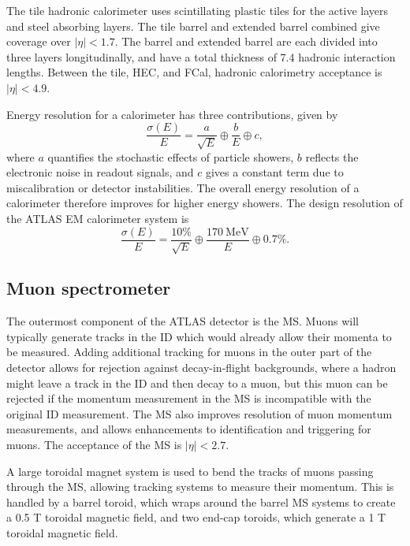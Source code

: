 The tile hadronic calorimeter uses scintillating plastic tiles for the active
layers and steel absorbing layers. The tile barrel and extended barrel combined
give coverage over $|\eta| < 1.7$. The barrel and extended barrel are each divided
into three layers longitudinally, and have a total thickness of 7.4 hadronic
interaction lengths. 
Between the tile, \ac{HEC}, and \ac{FCal}, hadronic calorimetry acceptance is
$|\eta| < 4.9$.

Energy resolution for a calorimeter has three contributions, given by
\begin{equation*}
  \frac{\sigma(E)}{E} = \frac{a}{\sqrt{E}} \oplus \frac{b}{E} \oplus c,
\end{equation*}
where $a$ quantifies the stochastic effects of particle
showers, $b$ reflects the electronic noise in readout signals, and $c$ gives a
constant term due to miscalibration or detector instabilities. The overall
energy resolution of a calorimeter therefore improves for higher energy showers.
The design resolution of the \ac{ATLAS} \ac{EM} calorimeter system is
\cite{Cavallari2011}
\begin{equation*}
  \frac{\sigma(E)}{E} = \frac{10\%}{\sqrt{E}} \oplus \frac{170~\text{MeV}}{E}
  \oplus 0.7\%.
\end{equation*}


\subsection{Muon spectrometer}

The outermost component of the \ac{ATLAS} detector is the \ac{MS}. Muons will
typically generate tracks in the \ac{ID} which would already allow their momenta
to be measured. Adding additional tracking for muons in the outer part of the
detector allows for rejection against decay-in-flight backgrounds, where a
hadron might leave a track in the \ac{ID} and then decay to a muon, but this
muon can be rejected if the momentum measurement in the \ac{MS} is incompatible
with the original \ac{ID} measurement.  The \ac{MS} also improves resolution of
muon momentum measurements, and allows enhancements to identification and
triggering for muons. The acceptance of the \ac{MS} is $|\eta| < 2.7$.

A large toroidal magnet system is used to bend the tracks of muons passing
through the \ac{MS}, allowing tracking systems to measure their momentum.
This is handled by a barrel toroid, which wraps around the barrel \ac{MS} systems
to create a 0.5 T toroidal magnetic field, and two end-cap toroids, which
generate a 1 T toroidal magnetic field.

